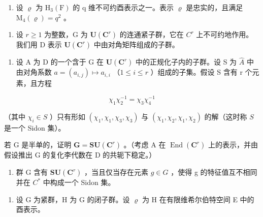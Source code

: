 \begin{enumerate}
\def\labelenumi{\alph{enumi})}
\setcounter{enumi}{4}
\tightlist
\item
  设 \(\varrho\) 为 \(\mathrm{H}_{3}(\mathrm{F})\) 的 q 维不可约酉表示之一。表示 \(\varrho\) 是忠实的，且满足 \(\mathrm{M}_{4}(\varrho)=q^{2}\) 。
\end{enumerate}

\begin{enumerate}
\def\labelenumi{\arabic{enumi})}
\setcounter{enumi}{15}
\tightlist
\item
  设 \(r \geqslant 1\) 为整数，G 为 \(\mathbf{U}(\mathbf{C}^{r})\) 的连通紧子群，它在 \(C^{r}\) 上不可约地作用。我们用 D 表示 \(\mathbf{U}(\mathbf{C}^{r})\) 中由对角矩阵组成的子群。
\end{enumerate}

\begin{enumerate}
\def\labelenumi{\alph{enumi})}
\tightlist
\item
  设 A 为 D 的一个含于 G 在 \(\mathbf{U}(\mathbf{C}^{r})\) 中的正规化子内的子群。设 S 为 \(\widehat{A}\) 中由对角系数 \(a = (a_{i,j}) \mapsto a_{i,i}\) （\(1 \leqslant i \leqslant r\) ）组成的子集。假设 S 含有 r 个元素，且方程
\end{enumerate}

\[
\chi_ {1} \chi_ {2} ^ {- 1} = \chi_ {3} \chi_ {4} ^ {- 1}
\]

（其中 \(\chi_{i} \in S\) ）只有形如 \((\chi_{1}, \chi_{1}, \chi_{3}, \chi_{3})\) 与 \((\chi_{1}, \chi_{2}, \chi_{1}, \chi_{2})\) 的解（这时称 \(S\) 是一个 Sidon 集）。

若 G 是半单的，证明 \(\mathbf{G} = \mathbf{S}\mathbf{U}(\mathbf{C}^{r})\) 。（考虑 A 在 \(\operatorname{End}(\mathbf{C}^{r})\) 上的表示，并由假设推出 G 的复化李代数在 D 的共轭下稳定。）

\begin{enumerate}
\def\labelenumi{\alph{enumi})}
\setcounter{enumi}{1}
\tightlist
\item
  群 G 含有 \(\mathbf{SU}(\mathbf{C}^{r})\) ，当且仅当存在元素 \(g \in G\) ，使得 g 的特征值互不相同并在 \(C^{*}\) 中构成一个 Sidon 集。
\end{enumerate}

\begin{enumerate}
\def\labelenumi{\arabic{enumi})}
\setcounter{enumi}{16}
\tightlist
\item
  设 G 为紧群，H 为 G 的闭子群。设 \(\varrho\) 为 H 在有限维希尔伯特空间 E 中的酉表示。
\end{enumerate}

